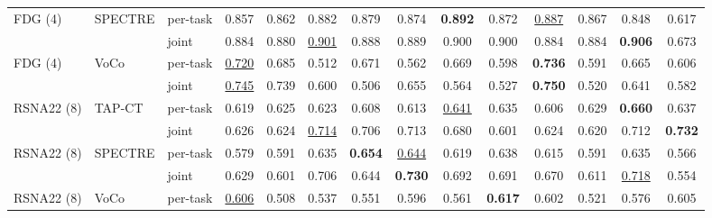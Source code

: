 \begin{tabular}{lllccccccccccc}
\addlinespace[2pt]
FDG (4) & SPECTRE & per-task & 0.857 & 0.862 & 0.882 & 0.879 & 0.874 & \textbf{0.892} & 0.872 & \cellcolor{modebest}\underline{0.887} & 0.867 & 0.848 & 0.617 \\
 &  & joint & \cellcolor{modebest}0.884 & \cellcolor{modebest}0.880 & \cellcolor{modebest}\underline{0.901} & \cellcolor{modebest}0.888 & \cellcolor{modebest}0.889 & \cellcolor{modebest}0.900 & \cellcolor{modebest}0.900 & 0.884 & \cellcolor{modebest}0.884 & \cellcolor{modebest}\textbf{0.906} & \cellcolor{modebest}0.673 \\
\addlinespace[2pt]
FDG (4) & VoCo & per-task & \underline{0.720} & 0.685 & 0.512 & \cellcolor{modebest}0.671 & 0.562 & \cellcolor{modebest}0.669 & \cellcolor{modebest}0.598 & \textbf{0.736} & \cellcolor{modebest}0.591 & \cellcolor{modebest}0.665 & \cellcolor{modebest}0.606 \\
 &  & joint & \cellcolor{modebest}\underline{0.745} & \cellcolor{modebest}0.739 & \cellcolor{modebest}0.600 & 0.506 & \cellcolor{modebest}0.655 & 0.564 & 0.527 & \cellcolor{modebest}\textbf{0.750} & 0.520 & 0.641 & 0.582 \\
\addlinespace[2pt]
RSNA22 (8) & TAP-CT & per-task & 0.619 & \cellcolor{modebest}0.625 & 0.623 & 0.608 & 0.613 & \underline{0.641} & \cellcolor{modebest}0.635 & 0.606 & \cellcolor{modebest}0.629 & \textbf{0.660} & 0.637 \\
 &  & joint & \cellcolor{modebest}0.626 & 0.624 & \cellcolor{modebest}\underline{0.714} & \cellcolor{modebest}0.706 & \cellcolor{modebest}0.713 & \cellcolor{modebest}0.680 & 0.601 & \cellcolor{modebest}0.624 & 0.620 & \cellcolor{modebest}0.712 & \cellcolor{modebest}\textbf{0.732} \\
\addlinespace[2pt]
RSNA22 (8) & SPECTRE & per-task & 0.579 & 0.591 & 0.635 & \cellcolor{modebest}\textbf{0.654} & \underline{0.644} & 0.619 & 0.638 & 0.615 & 0.591 & 0.635 & \cellcolor{modebest}0.566 \\
 &  & joint & \cellcolor{modebest}0.629 & \cellcolor{modebest}0.601 & \cellcolor{modebest}0.706 & 0.644 & \cellcolor{modebest}\textbf{0.730} & \cellcolor{modebest}0.692 & \cellcolor{modebest}0.691 & \cellcolor{modebest}0.670 & \cellcolor{modebest}0.611 & \cellcolor{modebest}\underline{0.718} & 0.554 \\
\addlinespace[2pt]
RSNA22 (8) & VoCo & per-task & \cellcolor{modebest}\underline{0.606} & 0.508 & 0.537 & \cellcolor{modebest}0.551 & \cellcolor{modebest}0.596 & 0.561 & \cellcolor{modebest}\textbf{0.617} & 0.602 & 0.521 & 0.576 & \cellcolor{modebest}0.605 \\

\end{tabular}
